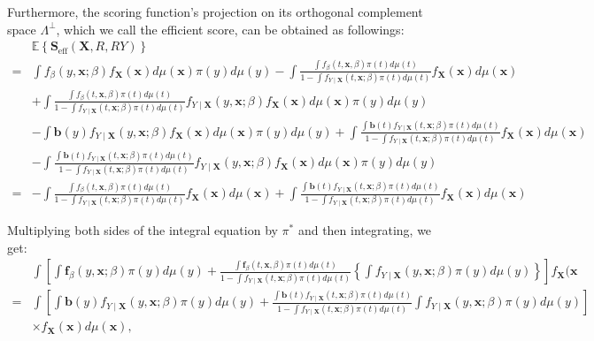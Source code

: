 \documentclass[11pt]{article}
\begin{document}
Furthermore, the scoring function's projection on its orthogonal complement space $\Lambda^\perp$, which we call the efficient score, can be obtained as followings:
$$
\begin{aligned}
& \mathbb{E}\left\{\mathbf{S}_{\mathrm{eff}}(\mathbf{X}, R, R Y)\right\} \\
= & \int f_\beta(y, \mathbf{x} ; \beta) f_{\mathbf{X}}(\mathbf{x}) d \mu(\mathbf{x}) \pi(y) d \mu(y)-\int \frac{\int f_\beta(t, \mathbf{x}, \beta) \pi(t) d \mu(t)}{1-\int f_{Y \mid \mathbf{X}}(t, \mathbf{x} ; \beta) \pi(t) d \mu(t)} f_{\mathbf{X}}(\mathbf{x}) d \mu(\mathbf{x}) \\
& +\int \frac{\int f_\beta(t, \mathbf{x}, \beta) \pi(t) d \mu(t)}{1-\int f_{Y \mid \mathbf{X}}(t, \mathbf{x} ; \beta) \pi(t) d \mu(t)} f_{Y \mid \mathbf{X}}(y, \mathbf{x} ; \beta) f_{\mathbf{X}}(\mathbf{x}) d \mu(\mathbf{x}) \pi(y) d \mu(y) \\
& -\int \mathbf{b}(y) f_{Y \mid \mathbf{X}}(y, \mathbf{x} ; \beta) f_{\mathbf{X}}(\mathbf{x}) d \mu(\mathbf{x}) \pi(y) d \mu(y)+\int \frac{\int \mathbf{b}(t) f_{Y \mid \mathbf{X}}(t, \mathbf{x} ; \beta) \pi(t) d \mu(t)}{1-\int f_{Y \mid \mathbf{X}}(t, \mathbf{x} ; \beta) \pi(t) d \mu(t)} f_{\mathbf{X}}(\mathbf{x}) d \mu(\mathbf{x}) \\
& -\int \frac{\int \mathbf{b}(t) f_{Y \mid \mathbf{X}}(t, \mathbf{x} ; \beta) \pi(t) d \mu(t)}{1-\int f_{Y \mid \mathbf{X}}(t, \mathbf{x} ; \beta) \pi(t) d \mu(t)} f_{Y \mid \mathbf{X}}(y, \mathbf{x} ; \beta) f_{\mathbf{X}}(\mathbf{x}) d \mu(\mathbf{x}) \pi(y) d \mu(y) \\
= & -\int \frac{\int f_\beta(t, \mathbf{x}, \beta) \pi(t) d \mu(t)}{1-\int f_{Y \mid \mathbf{X}}(t, \mathbf{x} ; \beta) \pi(t) d \mu(t)} f_{\mathbf{X}}(\mathbf{x}) d \mu(\mathbf{x})+\int \frac{\int \mathbf{b}(t) f_{Y \mid \mathbf{X}}(t, \mathbf{x} ; \beta) \pi(t) d \mu(t)}{1-\int f_{Y \mid \mathbf{X}}(t, \mathbf{x} ; \beta) \pi(t) d \mu(t)} f_{\mathbf{X}}(\mathbf{x}) d \mu(\mathbf{x})
\end{aligned}
$$

Multiplying both sides of the integral equation by $\pi^*$ and then integrating, we get:
$$
\begin{aligned}
& \int\left[\int \mathbf{f}_\beta(y, \mathbf{x} ; \beta) \pi(y) d \mu(y)+\frac{\int \mathbf{f}_\beta(t, \mathbf{x}, \beta) \pi(t) d \mu(t)}{1-\int f_{Y \mid \mathbf{X}}(t, \mathbf{x} ; \beta) \pi(t) d \mu(t)}\left\{\int f_{Y \mid \mathbf{X}}(y, \mathbf{x} ; \beta) \pi(y) d \mu(y)\right\}\right] f_{\mathbf{X}}(\mathbf{x} \\
= & \int\left[\int \mathbf{b}(y) f_{Y \mid \mathbf{X}}(y, \mathbf{x} ; \beta) \pi(y) d \mu(y)+\frac{\int \mathbf{b}(t) f_{Y \mid \mathbf{X}}(t, \mathbf{x} ; \beta) \pi(t) d \mu(t)}{1-\int f_{Y \mid \mathbf{X}}(t, \mathbf{x} ; \beta) \pi(t) d \mu(t)} \int f_{Y \mid \mathbf{X}}(y, \mathbf{x} ; \beta) \pi(y) d \mu(y)\right] \\
& \times f_{\mathbf{X}}(\mathbf{x}) d \mu(\mathbf{x}),
\end{aligned}
$$
\end{document}
